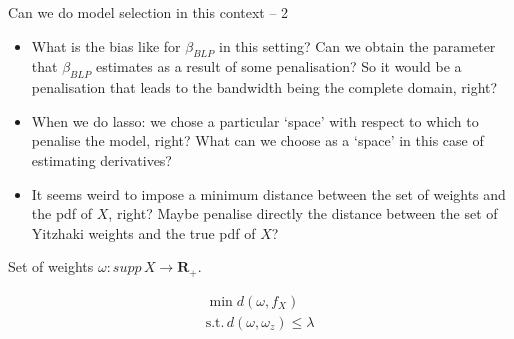 \documentclass{beamer}
\begin{document}
\begin{frame}{Can we do model selection in this context -- 2}
	\begin{itemize}
		\item What is the bias like for $\beta_{BLP}$ in this setting? Can we obtain the parameter that $\beta_{BLP}$ estimates as a result of some penalisation? So it would be a penalisation that leads to the bandwidth being the complete domain, right?
		\item When we do lasso: we chose a particular `space' with respect to which to penalise the model, right? What can we choose as a `space' in this case of estimating derivatives?
		\item It seems weird to impose a minimum distance between the set of weights and the pdf of $X$, right? Maybe penalise directly the distance between the set of Yitzhaki weights and the true pdf of $X$?
	\end{itemize}
	
	Set of weights $\omega: supp \, X \rightarrow \mathbf{R}_+$.

\begin{align}
	\min d(\omega, f_X) \\
	\textrm{s.t.} \, d(\omega, \omega_z) \leq \lambda
\end{align}
\end{frame}
\end{document}
